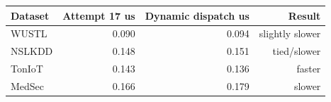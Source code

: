 \begin{tabular}{lrrr}
\toprule
Dataset & Attempt 17 us & Dynamic dispatch us & Result \\
\midrule
WUSTL & 0.090 & 0.094 & slightly slower \\
NSLKDD & 0.148 & 0.151 & tied/slower \\
TonIoT & 0.143 & 0.136 & faster \\
MedSec & 0.166 & 0.179 & slower \\
\bottomrule
\end{tabular}
